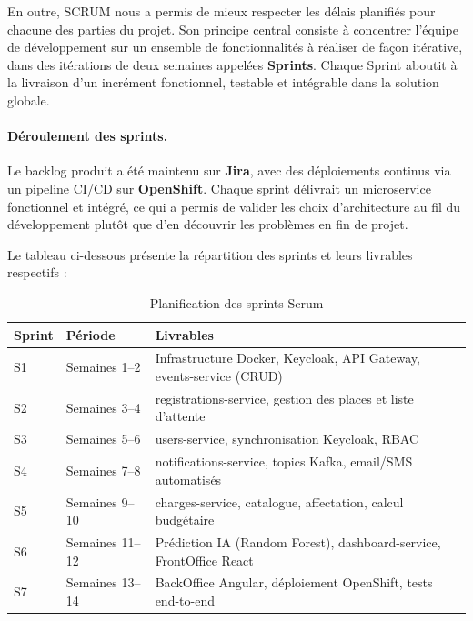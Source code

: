 \documentclass[12pt,a4paper]{report}
\newcommand{\tH}[1]{\cellcolor{lightBlue}\textbf{#1}}
\begin{document}
En outre, SCRUM nous a permis de mieux respecter les d\'elais planifi\'es pour chacune des
parties du projet. Son principe central consiste \`a concentrer l'\'equipe de d\'eveloppement
sur un ensemble de fonctionnalit\'es \`a r\'ealiser de fa\c{c}on it\'erative, dans des it\'erations
de deux semaines appel\'ees \textbf{Sprints}. Chaque Sprint aboutit \`a la livraison d'un
incrément fonctionnel, testable et int\'egrable dans la solution globale.

\paragraph{D\'eroulement des sprints.}
Le backlog produit a \'et\'e maintenu sur \textbf{Jira}, avec des d\'eploiements continus
via un pipeline CI/CD sur \textbf{OpenShift}. Chaque sprint d\'elivrait un microservice
fonctionnel et int\'egr\'e, ce qui a permis de valider les choix d'architecture au fil
du d\'eveloppement plut\^ot que d'en d\'ecouvrir les probl\`emes en fin de projet.

Le tableau ci-dessous pr\'esente la r\'epartition des sprints et leurs livrables respectifs :

\begin{table}[H]
\centering
\caption{Planification des sprints Scrum}
\label{tab:sprints}
\renewcommand{\arraystretch}{1.4}
\begin{tabularx}{\textwidth}{C{1.5cm} L{4cm} L{8cm}}
\hline
\tH{Sprint} & \tH{P\'eriode} & \tH{Livrables} \\
\hline
S1 & Semaines 1--2  & Infrastructure Docker, Keycloak, API Gateway, events-service (CRUD) \\
\hline
S2 & Semaines 3--4  & registrations-service, gestion des places et liste d'attente \\
\hline
S3 & Semaines 5--6  & users-service, synchronisation Keycloak, RBAC \\
\hline
S4 & Semaines 7--8  & notifications-service, topics Kafka, email/SMS automatis\'es \\
\hline
S5 & Semaines 9--10 & charges-service, catalogue, affectation, calcul budg\'etaire \\
\hline
S6 & Semaines 11--12 & Pr\'ediction IA (Random Forest), dashboard-service, FrontOffice React \\
\hline
S7 & Semaines 13--14 & BackOffice Angular, d\'eploiement OpenShift, tests end-to-end \\
\hline
\end{tabularx}
\end{table}
\end{document}
